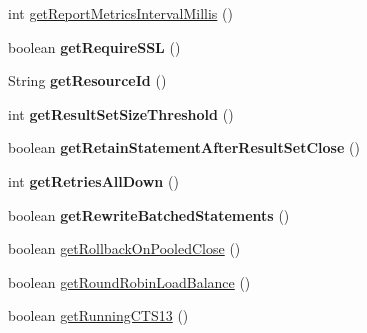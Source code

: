 \begin{DoxyCompactItemize}
\item 
int \mbox{\hyperlink{classcom_1_1mysql_1_1jdbc_1_1_multi_host_my_s_q_l_connection_a8b847e33c04c41470b7ee6e10dafa60f}{get\+Report\+Metrics\+Interval\+Millis}} ()
\item 
\mbox{\label{classcom_1_1mysql_1_1jdbc_1_1_multi_host_my_s_q_l_connection_a3ad138be70d9a82a190305abc660e3a4}} 
boolean {\bfseries get\+Require\+S\+SL} ()
\item 
\mbox{\label{classcom_1_1mysql_1_1jdbc_1_1_multi_host_my_s_q_l_connection_a461b59563dc091204df2687c1435f4f0}} 
String {\bfseries get\+Resource\+Id} ()
\item 
\mbox{\label{classcom_1_1mysql_1_1jdbc_1_1_multi_host_my_s_q_l_connection_ab7227705633e491fbb3a7080d2d52357}} 
int {\bfseries get\+Result\+Set\+Size\+Threshold} ()
\item 
\mbox{\label{classcom_1_1mysql_1_1jdbc_1_1_multi_host_my_s_q_l_connection_aa6b9bb6a470e49032f0d0583a1e7badc}} 
boolean {\bfseries get\+Retain\+Statement\+After\+Result\+Set\+Close} ()
\item 
\mbox{\label{classcom_1_1mysql_1_1jdbc_1_1_multi_host_my_s_q_l_connection_a0252d9a60994d576df643691ef3bda1b}} 
int {\bfseries get\+Retries\+All\+Down} ()
\item 
\mbox{\label{classcom_1_1mysql_1_1jdbc_1_1_multi_host_my_s_q_l_connection_a655c40909c0222fdd54eb51ae879ac46}} 
boolean {\bfseries get\+Rewrite\+Batched\+Statements} ()
\item 
boolean \mbox{\hyperlink{classcom_1_1mysql_1_1jdbc_1_1_multi_host_my_s_q_l_connection_a6e4539fdcc9a9aaa023d2902f1fbb1ef}{get\+Rollback\+On\+Pooled\+Close}} ()
\item 
boolean \mbox{\hyperlink{classcom_1_1mysql_1_1jdbc_1_1_multi_host_my_s_q_l_connection_a262fd54d367adf5972243b82981778ad}{get\+Round\+Robin\+Load\+Balance}} ()
\item 
boolean \mbox{\hyperlink{classcom_1_1mysql_1_1jdbc_1_1_multi_host_my_s_q_l_connection_a560585155115e4a2a82356fffe5fc672}{get\+Running\+C\+T\+S13}} ()

\end{DoxyCompactItemize}
